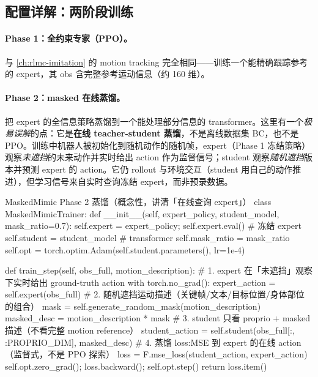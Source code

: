 \subsection{配置详解：两阶段训练}
\label{sec:rlmc-mm-masked-train}

\paragraph{Phase 1：全约束专家（PPO）。}与 \cref{ch:rlmc-imitation} 的 motion tracking 完全相同——训练一个能精确跟踪参考的 expert，其 obs 含完整参考运动信息（约 160 维）。

\paragraph{Phase 2：masked 在线蒸馏。}把 expert 的全信息策略蒸馏到一个能处理部分信息的 transformer。这里有一个\emph{极易误解}的点：它是\textbf{在线 teacher-student 蒸馏}，不是离线数据集 BC，也不是 PPO。训练中机器人被初始化到随机动作的随机帧，expert（Phase 1 冻结策略）观察\emph{未遮挡}的未来动作并实时给出 action 作为监督信号；student 观察\emph{随机遮挡}版本并预测 expert 的 action。它仍 rollout 与环境交互（student 用自己的动作推进），但学习信号来自实时查询冻结 expert，而非预录数据。

\begin{codebox}[Python]{MaskedMimic Phase 2 蒸馏（概念性，讲清「在线查询 expert」）}
class MaskedMimicTrainer:
    def __init__(self, expert_policy, student_model, mask_ratio=0.7):
        self.expert = expert_policy; self.expert.eval()   # 冻结 expert
        self.student = student_model                      # transformer
        self.mask_ratio = mask_ratio
        self.opt = torch.optim.Adam(self.student.parameters(), lr=1e-4)

    def train_step(self, obs_full, motion_description):
        # 1. expert 在「未遮挡」观察下实时给出 ground-truth action
        with torch.no_grad():
            expert_action = self.expert(obs_full)
        # 2. 随机遮挡运动描述（关键帧/文本/目标位置/身体部位 的组合）
        mask = self.generate_random_mask(motion_description)
        masked_desc = motion_description * mask
        # 3. student 只看 proprio + masked 描述（不看完整 motion reference）
        student_action = self.student(obs_full[:, :PROPRIO_DIM], masked_desc)
        # 4. 蒸馏 loss:MSE 到 expert 的在线 action（监督式，不是 PPO 探索）
        loss = F.mse_loss(student_action, expert_action)
        self.opt.zero_grad(); loss.backward(); self.opt.step()
        return loss.item()
\end{codebox}

